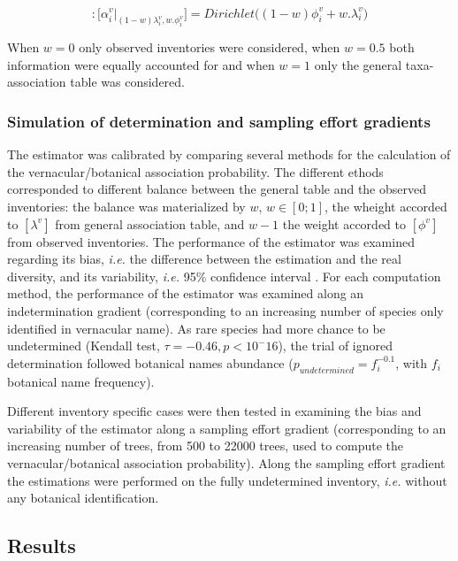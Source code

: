 \documentclass[
  11pt,
  french,
  A4paper,
  extrafontsizes,onecolumn,openright
  ]{memoir}
\begin{document}
\begin{equation}
[\alpha_i^v]: 
\Big[\alpha_i^v | _{(1-w)\lambda_i^v ,w.\phi_i^v}\Big] =Dirichlet\Big((1-w)\phi_i^v+w.\lambda_i^v\Big)
\label{eq:weighting}
\end{equation}

When \(w=0\) only observed inventories were considered, when \(w=0.5\)
both information were equally accounted for and when \(w=1\) only the
general taxa-association table was considered.

\subsubsection{Simulation of determination and sampling effort
gradients}\label{simulation-of-determination-and-sampling-effort-gradients}

The estimator was calibrated by comparing several methods for the
calculation of the vernacular/botanical association probability. The
different ethods corresponded to different balance between the general
table and the observed inventories: the balance was materialized by
\(w\), \(w\in[0;1]\), the wheight accorded to \([\lambda^v]\) from
general association table, and \(w-1\) the weight accorded to
\([\phi^v]\) from observed inventories. The performance of the estimator
was examined regarding its bias, \emph{i.e.} the difference between the
estimation and the real diversity, and its variability, \emph{i.e.} 95\%
confidence interval \autocite{Baltanas2009}. For each computation
method, the performance of the estimator was examined along an
indetermination gradient (corresponding to an increasing number of
species only identified in vernacular name). As rare species had more
chance to be undetermined (Kendall test, \(\tau = -0.46, p < 10^-16\)),
the trial of ignored determination followed botanical names abundance
(\(p_{undetermined}=f_i^{-0.1}\), with \(f_i\) botanical name
frequency).

Different inventory specific cases were then tested in examining the
bias and variability of the estimator along a sampling effort gradient
(corresponding to an increasing number of trees, from 500 to 22000
trees, used to compute the vernacular/botanical association
probability). Along the sampling effort gradient the estimations were
performed on the fully undetermined inventory, \emph{i.e.} without any
botanical identification.

\subsection{Results}\label{results}
\end{document}
